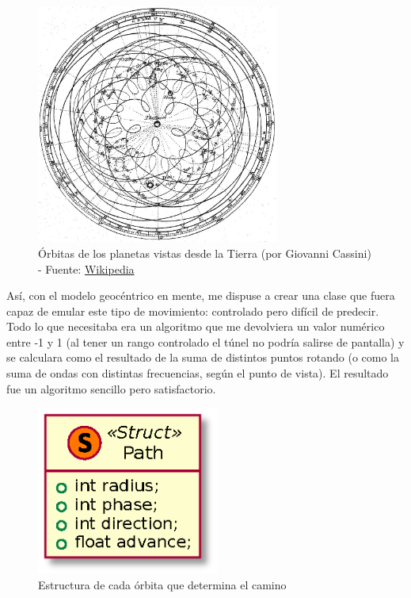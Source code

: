 \begin{figure}[h]
	\centering
	\includegraphics[width=8cm]{archivos/cassini}
	\caption{Órbitas de los planetas vistas desde la Tierra (por Giovanni Cassini) - Fuente: \href{https://es.wikipedia.org/wiki/Teoría_heliocéntrica\#/media/File:Cassini_apparent.jpg}{Wikipedia}}
	\label{fig:cassini}
\end{figure}

Así, con el modelo geocéntrico en mente, me dispuse a crear una clase que fuera capaz de emular este tipo de movimiento: controlado pero difícil de predecir.\\

Todo lo que necesitaba era un algoritmo que me devolviera un valor numérico entre -1 y 1 (al tener un rango controlado el túnel no podría salirse de pantalla) y se calculara como el resultado de la suma de distintos puntos rotando (o como la suma de ondas con distintas frecuencias, según el punto de vista). El resultado fue un algoritmo sencillo pero satisfactorio.\\

\begin{figure}[h]
	\centering
	\includegraphics[width=6cm]{archivos/pathuml}
	\caption{Estructura de cada órbita que determina el camino}
	\label{fig:pathuml}
\end{figure}

